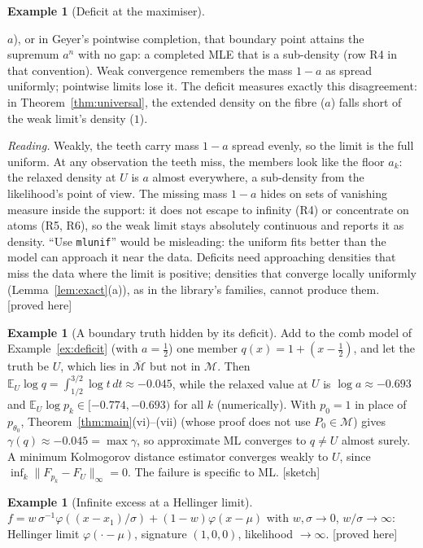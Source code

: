 \documentclass[11pt]{article}
\newcommand{\E}{\mathbb E}
\newcommand{\cM}{\mathcal M}
\newcommand{\bM}{\overline{\mathcal M}}
\newcommand{\status}[1]{\textsf{[#1]}}
\theoremstyle{definition}
\newtheorem{example}[theorem]{Example}
\theoremstyle{remark}
\begin{document}
\begin{example}[Deficit at the maximiser]
\begin{enumerate}
  $a$), or in Geyer's pointwise completion, that boundary point attains the
  supremum $a^n$ with no gap: a completed MLE that is a sub-density (row
  R4 in that convention). Weak convergence remembers the mass $1-a$ as
  spread uniformly; pointwise limits lose it. The deficit measures exactly
  this disagreement: in Theorem~\ref{thm:universal}, the extended density on
  the fibre ($a$) falls short of the weak limit's density ($1$).
\end{enumerate}
\emph{Reading.} Weakly, the teeth carry mass $1-a$ spread evenly, so the
limit is the full uniform. At any observation the teeth miss, the members
look like the floor $a_k$: the relaxed density at $U$ is $a$ almost
everywhere, a sub-density from the likelihood's point of view. The missing
mass $1-a$ hides on sets of vanishing measure inside the support: it does
not escape to infinity (R4) or concentrate on atoms (R5, R6), so the weak
limit stays absolutely continuous and reports it as density. ``Use
\texttt{mlunif}'' would be misleading: the uniform fits better than the
model can approach it near the data. Deficits need approaching densities
that miss the data where the limit is positive; densities that converge
locally uniformly (Lemma~\ref{lem:exact}(a)), as in the library's families,
cannot produce them. \status{proved here}
\end{example}

\begin{example}[A boundary truth hidden by its deficit]\label{ex:deficit-truth}
Add to the comb model of Example~\ref{ex:deficit} (with $a=\frac12$) one
member $q(x)=1+(x-\frac12)$, and let the truth be $U$, which lies in $\bM$
but not in $\cM$. Then
$\E_U\log q=\int_{1/2}^{3/2}\log t\,dt\approx-0.045$, while the relaxed value
at $U$ is $\log a\approx-0.693$ and
$\E_U\log p_k\in[-0.774,-0.693)$ for all $k$ (numerically). With $p_0=1$ in
place of $p_{\theta_0}$, Theorem~\ref{thm:main}(vi)--(vii) (whose proof does
not use $P_0\in\cM$) gives $\gamma(q)\approx-0.045=\max\gamma$, so approximate
ML converges to $q\ne U$ almost surely. A minimum Kolmogorov distance
estimator converges weakly to $U$, since $\inf_k\|F_{p_k}-F_U\|_\infty=0$.
The failure is specific to ML. \status{sketch}
\end{example}

\begin{example}[Infinite excess at a Hellinger limit]\label{ex:spike}
$f=w\,\sigma^{-1}\varphi((x-x_1)/\sigma)+(1-w)\varphi(x-\mu)$ with
$w,\sigma\to0$, $w/\sigma\to\infty$: Hellinger limit $\varphi(\cdot-\mu)$,
signature $(1,0,0)$, likelihood $\to\infty$. \status{proved here}
\end{example}
\end{document}
